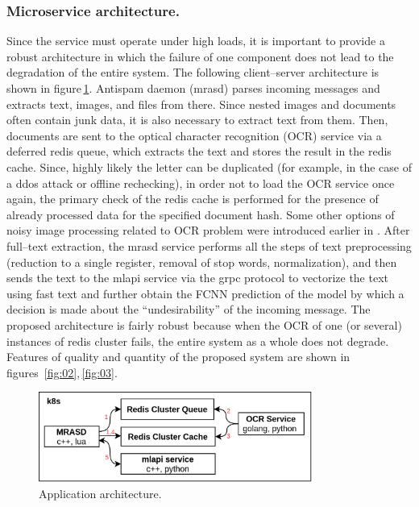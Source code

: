 \documentclass[a4paper]{jpconf}
\begin{document}
\subsubsection*{Microservice architecture.}
Since the service must operate under high loads, it is important to provide a robust architecture in which the failure of one component does not lead to the degradation of the entire system. The following client--server architecture is shown in figure\,\ref{fig:01}. Antispam daemon (mrasd) parses incoming messages and extracts text, images, and files from there. Since nested images and documents often contain junk data, it is also necessary to extract text from them. Then, documents are sent to the optical character recognition (OCR) service via a deferred redis queue, which extracts the text and stores the result in the redis cache.
Since, highly likely the letter can be duplicated (for example, in the case of a ddos attack or offline rechecking), in order not to load the OCR service once again, the primary check of the redis cache is performed for the presence of already processed data for the specified document hash.
Some other options of noisy image processing related to OCR problem were introduced earlier in \cite{Churikov2004,Kravchenko2005}.
After full--text extraction, the mrasd service performs all the steps of text preprocessing (reduction to a single register, removal of stop words, normalization), and then sends the text to the mlapi service via the grpc protocol to vectorize the text using fast text and further obtain the FCNN prediction of the model by which a decision is made about the ``undesirability'' of the incoming message.
The proposed architecture is fairly robust because when the OCR of one (or several) instances of redis cluster fails, the entire system as a whole does not degrade. Features of quality and quantity of the proposed system are shown in figures~\ref{fig:02},\,\ref{fig:03}.

\begin{figure}[h]
\center
\includegraphics[width=0.8\textwidth]{images/architecture.jpg}
\caption{\label{fig:01} Application architecture.}
\end{figure}
\end{document}
